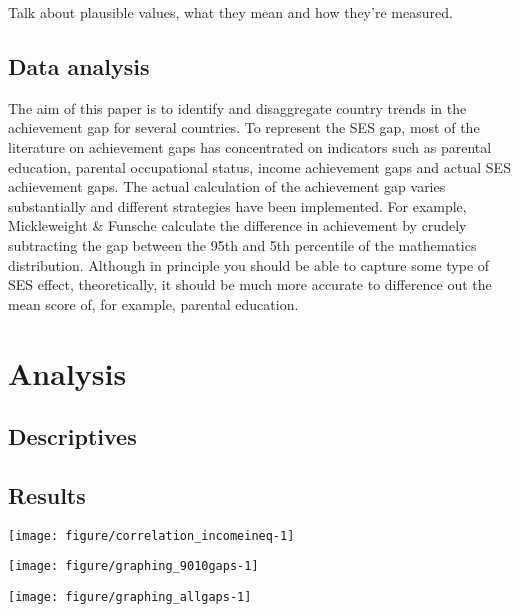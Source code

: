 \documentclass[11pt, a4paper]{article}\usepackage[]{graphicx}\usepackage[]{color}
\begin{document}
Talk about plausible values, what they mean and how they're measured.

\subsection{Data analysis}

The aim of this paper is to identify and disaggregate country trends in the achievement gap for several countries. To represent the SES gap, most of the literature on achievement gaps has concentrated on indicators such as parental education, parental occupational status, income achievement gaps and actual SES achievement gaps. The actual calculation of the achievement gap varies substantially and different strategies have been implemented. For example, Mickleweight & Funsche calculate the difference in achievement by crudely subtracting the gap between the 95th and 5th percentile of the mathematics distribution. Although in principle you should be able to capture some type of SES effect, theoretically, it should be much more accurate to difference out the mean score of, for example, parental education.
\section{Analysis}

\subsection{Descriptives}






\subsection{Results}



{\centering \texttt{[image: figure/correlation\_incomeineq-1]} 

}






{\centering \texttt{[image: figure/graphing\_9010gaps-1]} 

}






{\centering \texttt{[image: figure/graphing\_allgaps-1]} 

}
\end{document}
